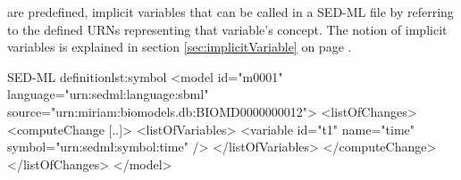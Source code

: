  are predefined, implicit variables that can be called in a SED-ML file by referring to the defined URNs representing that variable's concept. The notion of implicit variables is explained in section \ref{sec:implicitVariable} on page .

%
\begin{myXmlLst}{SED-ML  definition}{lst:symbol}
<model id="m0001" language="urn:sedml:language:sbml" 
 source="urn:miriam:biomodels.db:BIOMD0000000012">
 <listOfChanges>
  <computeChange [..]> 
   <listOfVariables>
    <variable id="t1" name="time" symbol="urn:sedml:symbol:time" />
   </listOfVariables>
  </computeChange>
 </listOfChanges>
</model>
\end{myXmlLst}
%


